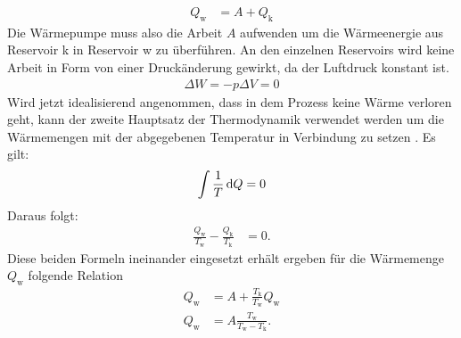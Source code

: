 \begin{align}
    Q_\text{w}    &= A +  Q_\text{k} %
\end{align}
%
Die Wärmepumpe muss also die Arbeit $A$ aufwenden um die Wärmeenergie aus Reservoir k in Reservoir w zu überführen.
An den einzelnen Reservoirs wird keine Arbeit in Form von einer Druckänderung gewirkt, da der Luftdruck konstant ist.
\begin{align*}
    \Delta W = - p \Delta V = 0 
\end{align*}
Wird jetzt idealisierend angenommen, dass in dem Prozess keine Wärme verloren geht, kann der zweite Hauptsatz der Thermodynamik
verwendet werden um die Wärmemengen mit der abgegebenen Temperatur in Verbindung zu setzen \cite[vgl.][1]{man:v206}. 
Es gilt:
\begin{align*}
    \int \frac{1}{T} \diff Q = 0 %
\end{align*}
Daraus folgt:
\begin{align}
    \frac{Q_\text{w}}{T_\text{w}} - \frac{Q_\text{k}}{T_\text{k}} &= 0.%
\end{align}
Diese beiden Formeln ineinander eingesetzt erhält ergeben für die Wärmemenge $Q_\text{w}$ folgende Relation \cite{man:v206}
\begin{align}
\nonumber    Q_\text{w} &= A + \frac{T_\text{k}}{T_\text{w}}Q_\text{w} \\
    Q_\text{w} &= A \frac{T_\text{w}}{T_\text{w} - T_\text{k}}.
\end{align}
